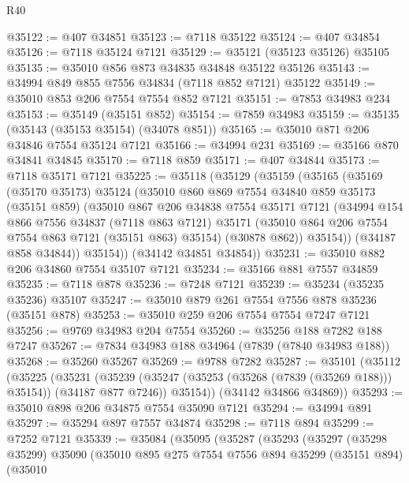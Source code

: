 \begin{lexlean}{R40}
\begin{coremodule}
@35122 := @407 @34851
@35123 := @7118 @35122
@35124 := @407 @34854
@35126 := @7118 @35124 @7121
@35129 := @35121 (@35123 @35126) @35105
@35135 := @35010 @856 @873 @34835 @34848 @35122 @35126
@35143 := @34994 @849 @855 @7556 @34834 (@7118 @852 @7121) @35122
@35149 := @35010 @853 @206 @7554 @7554 @852 @7121
@35151 := @7853 @34983 @234
@35153 := @35149 (@35151 @852)
@35154 := @7859 @34983
@35159 := @35135 (@35143 (@35153 @35154) (@34078 @851))
@35165 := @35010 @871 @206 @34846 @7554 @35124 @7121
@35166 := @34994 @231
@35169 := @35166 @870 @34841 @34845
@35170 := @7118 @859
@35171 := @407 @34844
@35173 := @7118 @35171 @7121
@35225 := @35118
    (@35129
      (@35159
        (@35165
          (@35169
            (@35170 @35173)
            @35124
            (@35010
              @860
              @869
              @7554
              @34840
              @859
              @35173
              (@35151 @859)
              (@35010
                @867
                @206
                @34838
                @7554
                @35171
                @7121
                (@34994
                  @154
                  @866
                  @7556
                  @34837
                  (@7118 @863 @7121)
                  @35171
                  (@35010 @864 @206 @7554 @7554 @863 @7121 (@35151 @863) @35154)
                  (@30878 @862))
                @35154))
            (@34187 @858 @34844))
          @35154))
      (@34142 @34851 @34854))
@35231 := @35010 @882 @206 @34860 @7554 @35107 @7121
@35234 := @35166 @881 @7557 @34859
@35235 := @7118 @878
@35236 := @7248 @7121
@35239 := @35234 (@35235 @35236) @35107
@35247 := @35010 @879 @261 @7554 @7556 @878 @35236 (@35151 @878)
@35253 := @35010 @259 @206 @7554 @7554 @7247 @7121
@35256 := @9769 @34983 @204 @7554
@35260 := @35256 @188 @7282 @188 @7247
@35267 := @7834 @34983 @188 @34964 (@7839 (@7840 @34983 @188))
@35268 := @35260 @35267
@35269 := @9788 @7282
@35287 := @35101
    (@35112
      (@35225
        (@35231
          (@35239 (@35247 (@35253 (@35268 (@7839 (@35269 @188))) @35154)) (@34187 @877 @7246))
          @35154))
      (@34142 @34866 @34869))
@35293 := @35010 @898 @206 @34875 @7554 @35090 @7121
@35294 := @34994 @891
@35297 := @35294 @897 @7557 @34874
@35298 := @7118 @894
@35299 := @7252 @7121
@35339 := @35084
    (@35095
      (@35287
        (@35293
          (@35297
            (@35298 @35299)
            @35090
            (@35010
              @895
              @275
              @7554
              @7556
              @894
              @35299
              (@35151 @894)
              (@35010

\end{coremodule}
\end{lexlean}
